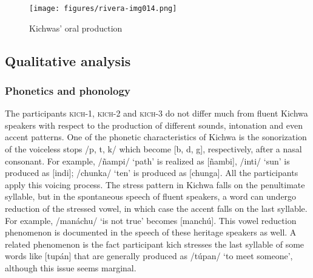 \documentclass[output=paper]{langscibook}
\begin{document}
\begin{figure}
\caption{Kichwas' oral production}
\label{fig:7:4}
\texttt{[image: figures/rivera-img014.png]}
\end{figure}

\subsection{{{Qualitative analysis}}}
\subsubsection{Phonetics and phonology}
\begin{sloppypar}
The participants \textsc{kich}-1, \textsc{kich}-2 and \textsc{kich}-3 do not differ much from fluent Kichwa speakers with respect to the production of different sounds, intonation and even accent patterns. One of the phonetic characteristics of Kichwa is the sonorization of the voiceless stops /p, t, k/ which become [b, d, g], respectively, after a nasal consonant. For example, /ñampi/ `path' is realized as [ñambi{]}, /inti/ ‘sun’ is produced as [indi{]}; /chunka/ ‘ten’ is produced as [chunga{]}. All the participants apply this voicing process. The stress pattern in Kichwa falls on the penultimate syllable, but in the spontaneous speech of fluent speakers, a word can undergo reduction of the stressed vowel, in which case the accent falls on the last syllable. For example, /manáchu/ ‘is not true’ becomes [manchú{]}. This vowel reduction phenomenon is documented in the speech of these heritage speakers as well. A related phenomenon is the fact participant kich stresses the last syllable of some words like [tupán{]} that are generally produced as /túpan/ `to meet someone', although this issue seems marginal.
\end{sloppypar}
\end{document}

